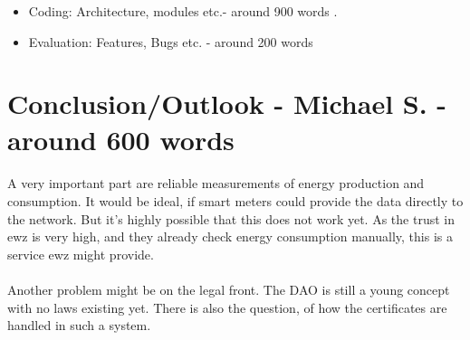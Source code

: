 \documentclass{scrartcl}
\begin{document}
    \begin{itemize}
    \item Coding: Architecture, modules etc.- around 900 words .
    \item Evaluation: Features, Bugs etc. - around 200 words
    \end{itemize}
	
    \section{Conclusion/Outlook - Michael S. - around 600 words}
	\paragraph{}
	A very important part are reliable measurements of energy production and consumption. It would be ideal, if smart meters could provide the data directly to the network. But it's highly possible that this does not work yet. As the trust in ewz is very high, and they already check energy consumption manually, this is a service ewz might provide.
	
    \paragraph{}
	Another problem might be on the legal front. The DAO is still a young concept with no laws existing yet. There is also the question, of how the certificates are handled in such a system.  
    
\end{document}
